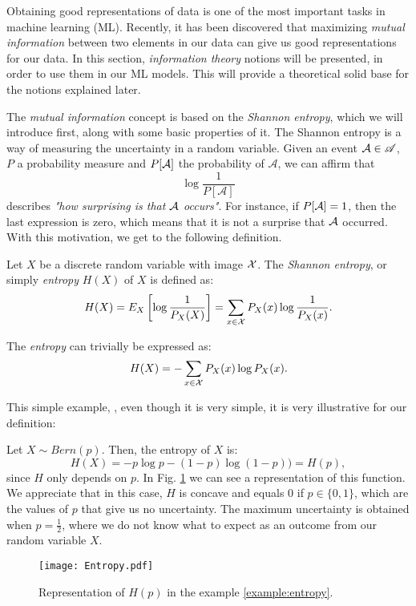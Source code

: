 Obtaining good representations of data is one of the most important tasks in machine learning (ML). 
Recently, it has been discovered that maximizing \emph{mutual information} between two elements in our data can give us good representations for our data.
In this section, \emph{information theory} notions will be presented, in order to use them in our ML models. This will provide a theoretical solid base for
the notions explained later.


The \emph{mutual information} concept is based on the \emph{Shannon entropy}, which we will introduce first, along with some basic properties of it. The Shannon entropy is a way of measuring the uncertainty in a random variable. 
Given an event $\mathcal A \in \mathscr{A}$, $P$ a probability measure and $P[\mathcal A]$ the probability of $\mathcal A$, we can affirm that 
$$
\log\frac{1}{P[\mathcal A]}
$$
describes \emph{"how surprising is that $\mathcal A$ occurs"}. For instance, if $P[\mathcal A] = 1$, then the last expression is zero, which means that it is not a surprise that $\mathcal A$ occurred. With this motivation, we get to the following definition.


\begin{ndef}
Let $X$ be a discrete random variable with image $\mathcal{X}$. The \emph{Shannon entropy}, or simply \emph{entropy}  $H(X)$ of $X$ is defined as:
$$
H(X) = E_X\left[\log\frac{1}{P_X(X)}\right] =  \sum_{x \in \mathcal{X}} P_X(x) \log\frac{1}{P_X(x)}.
$$
\end{ndef}
The \emph{entropy} can trivially be expressed as:
$$
H(X) = - \sum_{x \in \mathcal{X}}P_X (x)\log P_X(x).
$$

This simple example, \citep{cover_elements_1991}, even though it is very simple, it is very illustrative for our definition:

\begin{nexample}
    \label{example:entropy}
Let $X \sim Bern(p)$. Then, the entropy of $X$ is:
\[
H(X) = -p \log p - (1-p) \log(1-p)) = H(p),
\]
since $H$ only depends on $p$. In Fig. \ref{fig:example:entropy} we can see a representation of this function. We appreciate that in this case, $H$ is concave and equals $0$ if $p \in \{0,1\}$, which are the values of $p$ that give us no uncertainty. The maximum uncertainty is obtained when $p=\frac{1}{2}$, where we do not know what to expect as an outcome from our random variable $X$.

\begin{figure}[H]
    \label{fig:example:entropy}
    \centering
    \texttt{[image: Entropy.pdf]}

      \caption{Representation of $H(p)$ in the example \ref{example:entropy}.}
\end{figure}

\end{nexample}


